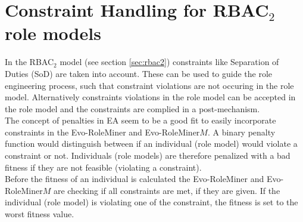     \section{Constraint Handling for RBAC$_2$ role models}
    In the RBAC$_2$ model (see section \ref{sec:rbac2}) constraints like Separation of Duties (SoD) are taken into account. These can be used to guide the role engineering process, such that constraint violations are not occuring in the role model. Alternatively constraints violations in the role model can be accepted in the role model and the constraints are complied in a post-mechanism.\\
    The concept of penalties in EA seem to be a good fit to easily incorporate constraints in the Evo-RoleMiner and Evo-RoleMiner$M$. A binary penalty function would distinguish between if an individual (role model) would violate a constraint or not. Individuals (role models) are therefore penalized with a bad fitness if they are not feasible (violating a constraint).\\
    Before the fitness of an individual is calculated the Evo-RoleMiner and Evo-RoleMiner$M$ are checking if all constraints are met, if they are given. If the individual (role model) is violating one of the constraint, the fitness is set to the worst fitness value.
